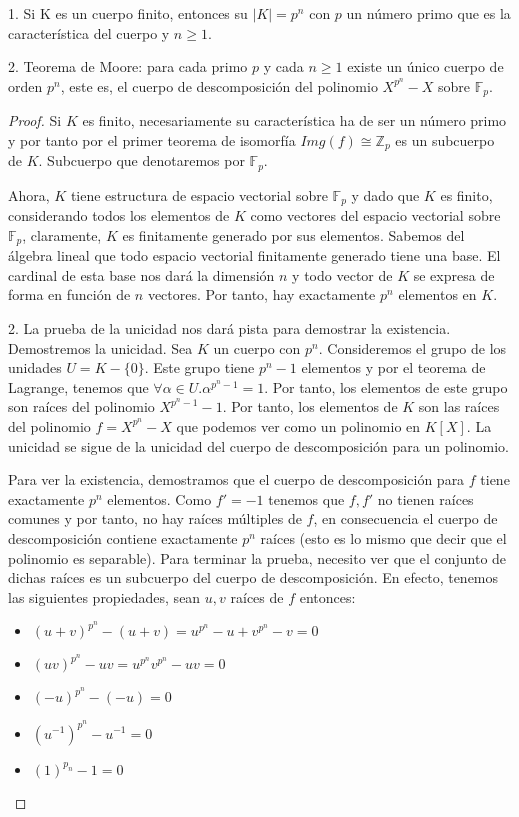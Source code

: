 \begin{theorem}
1. Si K es un cuerpo finito, entonces su $|K| = p^n$ con $p$ un número primo que es la característica del cuerpo y $n \ge 1$. 

2. Teorema de Moore: para cada primo $p$ y cada $n \ge 1$ existe un único cuerpo de orden $p^n$, este es, el cuerpo de descomposición del polinomio $X^{p^n} - X$ sobre $\mathbb{F}_p$. 
\end{theorem}
\begin{proof}
Si $K$ es finito, necesariamente su característica ha de ser un número primo y por tanto por el primer teorema de isomorfía $Img(f) \cong \mathbb{Z}_p$ es un subcuerpo de $K$. Subcuerpo que denotaremos por $\mathbb{F}_p$.

Ahora, $K$ tiene estructura de espacio vectorial sobre $\mathbb{F}_p$ y dado que $K$ es finito, considerando todos los elementos de $K$ como vectores del espacio vectorial sobre $\mathbb{F}_p$, claramente, $K$ es finitamente generado por sus elementos. Sabemos del álgebra lineal que todo espacio vectorial finitamente generado tiene una base. El cardinal de esta base nos dará la dimensión $n$ y todo vector de $K$ se expresa de forma en función de $n$ vectores. Por tanto, hay exactamente $p^n$ elementos en $K$. 

2. La prueba de la unicidad nos dará pista para demostrar la existencia. Demostremos la unicidad. Sea $K$ un cuerpo con $p^n$. Consideremos el grupo de los unidades $U = K-\{0\}$. Este grupo tiene $p^n - 1$ elementos y por el teorema de Lagrange, tenemos que $\forall \alpha \in U. \alpha^{p^n - 1} = 1$. Por tanto, los elementos de este grupo son raíces del polinomio $X^{p^n-1}-1$. Por tanto, los elementos de $K$ son las raíces del polinomio $f = X^{p^n}-X$ que podemos ver como un polinomio en $K[X]$. La unicidad se sigue de la unicidad del cuerpo de descomposición para un polinomio.

Para ver la existencia, demostramos que el cuerpo de descomposición para $f$ tiene exactamente $p^n$ elementos. Como $f' = -1$ tenemos que $f,f'$ no tienen raíces comunes y por tanto, no hay raíces múltiples de $f$, en consecuencia el cuerpo de descomposición contiene exactamente $p^n$ raíces (esto es lo mismo que decir que el polinomio es separable). Para terminar la prueba, necesito ver que el conjunto de dichas raíces es un subcuerpo del cuerpo de descomposición. En efecto, tenemos las siguientes propiedades, sean $u,v$ raíces de $f$ entonces:

\begin{itemize}
\item $(u+v)^{p^n} - (u+v) = u^{p^n}-u+v^{p^n}-v = 0$
\item $(uv)^{p^n}-uv = u^{p^n}v^{p^n} - uv = 0$
\item $(-u)^{p^n} - (-u) = 0$
\item $(u^{-1})^{p^n} - u^{-1} = 0$
\item $(1)^{p_n} - 1 = 0$
\end{itemize}
\end{proof}

